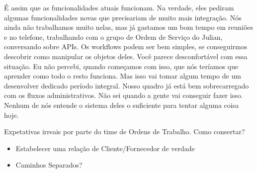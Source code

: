 \documentclass[12pt,play]{article}
\begin{document}
É assim que as funcionalidades atuais funcionam. Na verdade, eles pediram algumas funcionalidades novas que precisariam de muito mais integração. Nós ainda não trabalhamos muito nelas, mas já gastamos um bom tempo em reuniões e no telefone, trabalhando com o grupo de Ordem de Serviço do Julian, conversando sobre APIs. Os workflows podem ser bem simples, se conseguirmos descobrir como manipular os objetos deles.
\dani Você parece desconfortável com essa situação.
\clau Eu não percebi, quando começamos com isso, que nós teríamos que aprender como todo o resto funciona. Mas isso vai tomar algum tempo de um desenvolver dedicado período integral. Nosso quadro já está bem sobrecarregado com os fluxos administrativos. Não sei quando a gente vai conseguir fazer isso. Nenhum de nós entende o sistema deles o suficiente para tentar alguma coisa hoje.

\narr Expetativas irreais por parte do time de Ordens de Trabalho. Como consertar?
\begin{itemize}
	\item Estabelecer uma relação de Cliente/Fornecedor de verdade
	\item Caminhos Separados?
\end{itemize}
\end{document}
